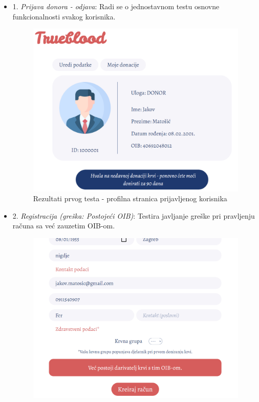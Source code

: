 			\begin{itemize}
			    \item 1. \textit{Prijava donora - odjava}:
			    Radi se o jednostavnom testu osnovne funkcionalnosti svakog korisnika. 
			    \begin{figure}[H]
                    \includegraphics[scale=0.5]{slike/Tests/sistem1.png}
        			\centering
        			\caption{Rezultati prvog testa - profilna stranica prijavljenog korisnika}
        			\label{fig:controller}
        		\end{figure}
			    \item 2. \textit{Registracija (greška: Postojeći OIB)}:
			    Testira javljanje greške pri pravljenju računa sa već zauzetim OIB-om.
			    \begin{figure}[H]
                    \includegraphics[scale=0.5]{slike/Tests/sistem2.png}

\end{figure}
\end{itemize}
